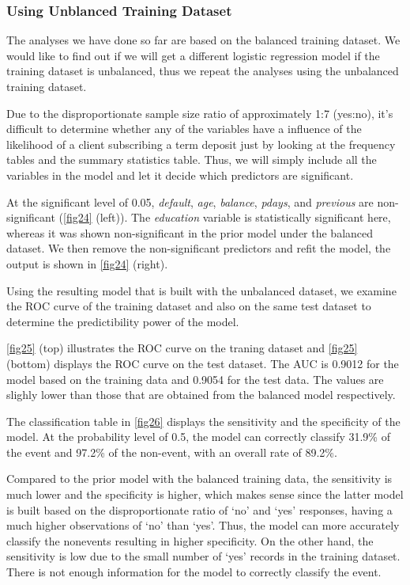 \documentclass[]{article}
\begin{document}
\subsubsection{Using Unblanced Training
Dataset}\label{using-unblanced-training-dataset}

The analyses we have done so far are based on the balanced training
dataset. We would like to find out if we will get a different logistic
regression model if the training dataset is unbalanced, thus we repeat
the analyses using the unbalanced training dataset.

Due to the disproportionate sample size ratio of approximately 1:7
(yes:no), it's difficult to determine whether any of the variables have
a influence of the likelihood of a client subscribing a term deposit
just by looking at the frequency tables and the summary statistics
table. Thus, we will simply include all the variables in the model and
let it decide which predictors are significant.

At the significant level of 0.05, \emph{default}, \emph{age},
\emph{balance}, \emph{pdays}, and \emph{previous} are non-significant
(\autoref{fig24} (left)). The \emph{education} variable is statistically
significant here, whereas it was shown non-significant in the prior
model under the balanced dataset. We then remove the non-significant
predictors and refit the model, the output is shown in \autoref{fig24}
(right).

Using the resulting model that is built with the unbalanced dataset, we
examine the ROC curve of the training dataset and also on the same test
dataset to determine the predictibility power of the model.

\autoref{fig25} (top) illustrates the ROC curve on the traning dataset
and \autoref{fig25} (bottom) displays the ROC curve on the test dataset.
The AUC is 0.9012 for the model based on the training data and 0.9054
for the test data. The values are slighly lower than those that are
obtained from the balanced model respectively.

The classification table in \autoref{fig26} displays the sensitivity and
the specificity of the model. At the probability level of 0.5, the model
can correctly classify 31.9\% of the event and 97.2\% of the non-event,
with an overall rate of 89.2\%.

Compared to the prior model with the balanced training data, the
sensitivity is much lower and the specificity is higher, which makes
sense since the latter model is built based on the disproportionate
ratio of `no' and `yes' responses, having a much higher observations of
`no' than `yes'. Thus, the model can more accurately classify the
nonevents resulting in higher specificity. On the other hand, the
sensitivity is low due to the small number of `yes' records in the
training dataset. There is not enough information for the model to
correctly classify the event.
\end{document}
